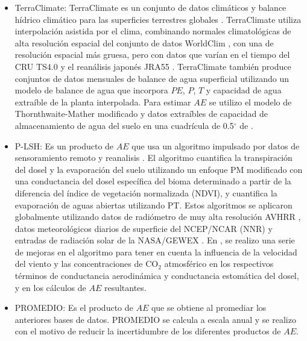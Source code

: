 \documentclass[12pt]{article}
\begin{document}
\begin{itemize}
	\item TerraClimate: TerraClimate es un conjunto de datos climáticos y balance hídrico climático para las superficies terrestres globales \citep{abatzoglou2018terraclimate}. TerraClimate utiliza interpolación asistida por el clima, combinando normales climatológicas de alta resolución espacial del conjunto de datos WorldClim \citep{fick2017worldclim}, con una de resolución espacial más gruesa, pero con datos que varían en el tiempo del CRU TS4.0 \citep{harris2014updated} y el reanálisis japonés JRA55 \citep{kobayashi2015jra}. TerraClimate también produce conjuntos de datos mensuales de balance de agua superficial utilizando un modelo de balance de agua que incorpora $PE$, $P$, $T$ y capacidad de agua extraíble de la planta interpolada. Para estimar $AE$ se utilizo el modelo de Thornthwaite-Mather \citep{willmott1985climatology} modificado y datos extraíbles de capacidad de almacenamiento de agua del suelo en una cuadrícula de 0.5$^{\circ}$ de \citet{wang2016global}.
	
	\item P-LSH: Es un producto de $AE$ que usa un algoritmo impulsado por datos de sensoramiento remoto y reanalisis \citep{zhang2010continuous}. El algoritmo cuantifica la transpiración del dosel y la evaporación del suelo utilizando un enfoque PM modificado con una conductancia del dosel específica del bioma determinado a partir de la diferencia del índice de vegetación normalizada (NDVI), y cuantifica la evaporación de aguas abiertas utilizando PT. Estos algoritmos se aplicaron globalmente utilizando datos de radiómetro de muy alta resolución AVHRR \citep{tucker2005extended}, datos meteorológicos diarios de superficie del NCEP/NCAR (NNR) \citep{kistler2001ncep} y entradas de radiación solar de la NASA/GEWEX \citep{pinker1992modeling}. En \citet{zhang2015vegetation}, se realizo una serie de mejoras en el algoritmo para tener en cuenta la influencia de la velocidad del viento y las concentraciones de CO$_{2}$ atmosférico en los respectivos términos de conductancia aerodinámica y conductancia estomática del dosel, y en los cálculos de $AE$ resultantes.
	
	\item PROMEDIO: Es el producto de $AE$ que se obtiene al promediar los anteriores bases de datos. PROMEDIO se calcula a escala anual y se realizo con el motivo de reducir la incertidumbre de los diferentes productos de $AE$. 
	
\end{itemize}
\end{document}
